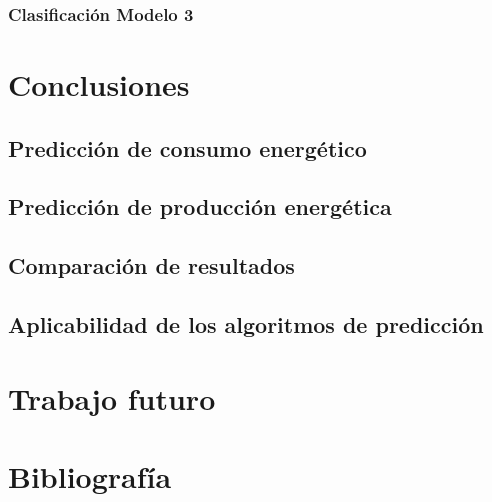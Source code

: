 \documentclass[a4paper,12pt]{article}
\begin{document}
\subsubsection{Clasificación Modelo 3}

\section{Conclusiones}

\subsection{Predicción de consumo energético}

\subsection{Predicción de producción energética}

\subsection{Comparación de resultados}

\subsection{Aplicabilidad de los algoritmos de predicción}

\section{Trabajo futuro}

\section*{Bibliografía}
\end{document}
